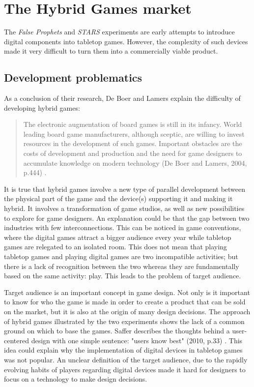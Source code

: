 \section{The Hybrid Games market}
The \textit{False Prophets} and \textit{STARS} experiments are early attempts to introduce digital components into tabletop games. However, the complexity of such devices made it very difficult to turn them into a commercially viable product. 

\subsection{Development problematics}
As a conclusion of their research, De Boer and Lamers explain the difficulty of developing hybrid games:

\begin{quotation}
The electronic augmentation of board games is still in its infancy. World leading board game manufacturers, although sceptic, are willing to invest resources in the development of such games. Important obstacles are the costs of development and production and the need for game designers to accumulate knowledge on modern technology (De Boer and Lamers, 2004, p.444) \cite{chap:aug}.
\end{quotation}

It is true that hybrid games involve a new type of parallel development between the physical part of the game and the device(s) supporting it and making it hybrid. It involves a transformation of game studios, as well as new possibilities to explore for game designers. An explanation could be that the gap between two industries with few interconnections. This can be noticed in game conventions, where the digital games attract a bigger audience every year while tabletop games are relegated to an isolated room. This does not mean that playing tabletop games and playing digital games are two incompatible activities; but there is a lack of recognition between the two whereas they are fundamentally based on the same activity: play. This leads to the problem of target audience.

Target audience is an important concept in game design. Not only is it important to know for who the game is made in order to create a product that can be sold on the market, but it is also at the origin of many design decisions. The approach of hybrid games illustrated by the two experiments shows the lack of a common ground on which to base the games. Saffer describes the thoughts behind a user-centered design with one simple sentence: "users know best" (2010, p.33) \cite{book:id}. This idea could explain why the implementation of digital devices in tabletop games was not popular.  An unclear definition of the target audience, due to the rapidly evolving habits of players regarding digital devices made it hard for designers to focus on a technology to make design decisions.

